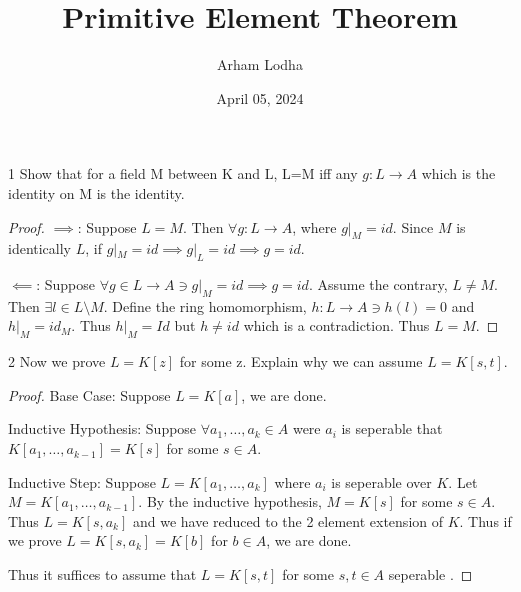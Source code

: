 \documentclass{article}
\begin{document}
\title{Primitive Element Theorem}
\author{Arham Lodha}%
\date{April 05, 2024}%
\maketitle

\begin{PROB}{1}\label{Problem 1.}
    Show that for a field M between K and L, L=M iff any $g: L \to A$  which is the identity on M is the identity.  
\end{PROB}
\begin{proof}
    $\implies$: Suppose $L = M$. Then $\forall g: L \to A$, where $g|_M = id$. Since $M$ is identically $L$, if $g|_M = id \implies g|_{L} = id \implies g = id$. 
    
    $\impliedby$: Suppose $\forall g \in L \to A \ni g|_{M} = id \implies g = id$. Assume the contrary, $L \neq M$. Then $\exists l \in L \setminus M$. Define the ring homomorphism, $h : L \to A \ni h(l) = 0$ and $h|_M = id_M$. Thus $h|_{M} = Id$ but $h \neq id$ which is a contradiction. Thus $L = M $.        
\end{proof}

\bigskip

\begin{PROB}{2}\label{Problem 2.}
    Now we prove $L = K[z]$ for some z.  Explain why we can assume $L = K[ s, t]$. 
\end{PROB}
\begin{proof}
    Base Case: Suppose $L = K[a]$, we are done. 
    
    Inductive Hypothesis: Suppose $\forall a_1, \dots, a_k \in A$ were $a_i$ is seperable that $K[a_1, \dots, a_{k-1}] = K[s]$ for some $s \in A$. 
    
    Inductive Step: Suppose $L = K[a_1, \dots, a_k]$ where $a_i$ is seperable over $K$. Let $M = K[a_1, \dots, a_{k-1}]$. By the inductive hypothesis, $M = K[s]$ for some $s \in A$. Thus $L = K[s, a_k]$ and we have reduced to the 2 element extension of $K$. Thus if we prove $L = K[s, a_k] = K[b]$ for $b \in A$, we are done. 
    
    
    Thus it suffices to assume that $L = K[s, t]$ for some $s, t \in A$ seperable .  

    
\end{proof}
\end{document}
